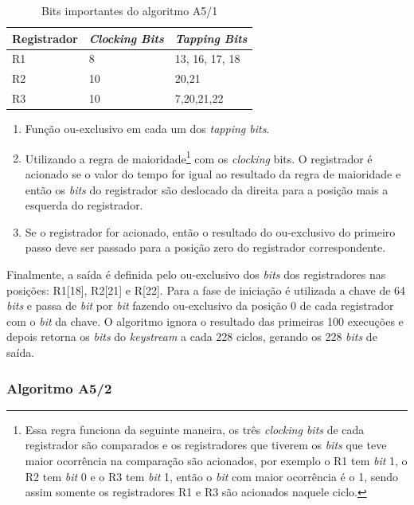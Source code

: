 \begin{table}[h]
\centering
	\begin{tabular}{|l|l|l|}
		\hline
		Registrador & \textit{Clocking Bits} & \textit{Tapping Bits} \\ \hline
		R1 & 8 & 13, 16, 17, 18 \\ \hline
		R2 & 10 & 20,21 \\ \hline
		R3 & 10 & 7,20,21,22 \\ \hline	
	\end{tabular}
	\caption{Bits importantes do algoritmo A5/1}
	\label{important-bits}
\end{table}

\begin{enumerate}
\item Função ou-exclusivo em cada um dos \textit{tapping bits}.
\item Utilizando a regra de maioridade\footnote{Essa regra funciona da seguinte maneira, os três \textit{clocking bits} de cada registrador são comparados e os registradores que tiverem os \textit{bits} que teve maior ocorrência na comparação são acionados, por exemplo o R1 tem \textit{bit} 1, o R2 tem \textit{bit} 0 e o R3 tem \textit{bit} 1, então o \textit{bit} com maior ocorrência é o 1, sendo assim somente os registradores R1 e R3 são acionados naquele ciclo.} com os \textit{clocking} bits. O registrador é acionado se o valor do tempo for igual ao resultado da regra de maioridade e então os \textit{bits} do registrador são deslocado da direita para a posição mais a esquerda do registrador.
\item Se o registrador for acionado, então o resultado do ou-exclusivo do primeiro passo deve ser passado para a posição zero do registrador correspondente.
\end{enumerate}

Finalmente, a saída é definida pelo ou-exclusivo dos \textit{bits} dos registradores nas posições: R1[18], R2[21] e R[22]. Para a fase de iniciação é utilizada a chave de 64 \textit{bits} e passa de \textit{bit} por \textit{bit} fazendo ou-exclusivo da posição 0 de cada registrador com o \textit{bit} da chave. O algoritmo ignora o resultado das primeiras 100 execuções e depois retorna os \textit{bits} do \textit{keystream} a cada 228 ciclos, gerando os 228 \textit{bits} de saída.

\subsubsection{Algoritmo A5/2}
\label{algorithm-a52}

